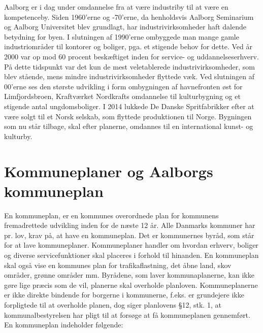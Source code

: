 Aalborg er i dag under omdannelse fra at være industriby til at være en kompetenceby. Siden 1960’erne og -70’erne, da henholdsvis Aalborg Seminarium og Aalborg Universitet blev grundlagt, har industrivirksomheder haft dalende betydning for byen. I slutningen af 1990’erne ombyggede man mange gamle industriområder til kontorer og boliger, pga. et stigende behov for dette. Ved år 2000 var op mod 60 procent beskæftiget inden for service- og uddannelseserhverv. På dette tidspunkt var det kun de mest veletablerede industrivirksomheder, som blev stående, mens mindre industrivirksomheder flyttede væk. Ved slutningen af 00’erne ses den største udvikling i form ombygningen af havnefronten øst for Limfjordsbroen, Kraftværket Nordkrafts omdannelse til kulturbygning og et stigende antal ungdomsboliger. I 2014 lukkede De Danske Spritfabrikker efter at være solgt til et Norsk selskab, som flyttede produktionen til Norge. Bygningen som nu står tilbage, skal efter planerne, omdannes til en international kunst- og kulturby.


\section{Kommuneplaner og Aalborgs kommuneplan}
En kommuneplan, er en kommunes overordnede plan for kommunens fremadrettede udvikling inden for de næste 12 år. Alle Danmarks kommuner har pr. lov, krav på, at have en kommuneplan. Det er kommunernes byråd, som står for at lave kommuneplaner. Kommuneplaner handler om hvordan erhverv, boliger og diverse servicefunktioner skal placeres i forhold til hinanden. En kommuneplan skal også vise en kommunes plan for trafikaflastning, det åbne land, skov områder, grønne områder mm. Byrådene, som laver kommunaplanerne, kan ikke gøre lige præcis som de vil, planerne skal overholde planloven. Kommuneplanerne er ikke direkte bindende for borgerne i kommunerne, f.eks. er grundejere ikke forpligtede til at overholde planen, dog siger planlovens §12, stk. 1, at kommunalbestyrelsen har pligt til at forsøge at få kommuneplanen gennemført. En kommuneplan indeholder følgende:

